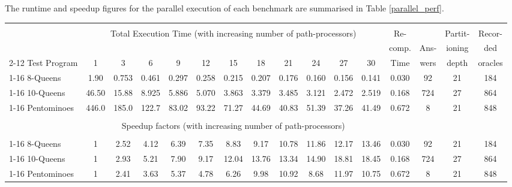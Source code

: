 The runtime and speedup figures for the parallel execution of each benchmark are summarised
in Table \ref{parallel_perf}.

\begin{sidewaystable}
{\small
\begin{tabular}{||l|c|c|c|c|c|c|c|c|c|c|c|c|c|c|c||} \hline
 & \multicolumn{11}{c|}{} & & &  & \\
 & \multicolumn{11}{c|}{ Total Execution Time (with increasing number of path-processors) }                          & Re-   &      & Partit-& Recor- \\
 & \multicolumn{11}{c|}{}                                                                                            & comp. & Ans- & ioning & ded    \\
  \cline{2-12} Test Program & 1     & 3     & 6     & 9     & 12    & 15    & 18    & 21    & 24    & 27    & 30     & Time  & wers & depth  & oracles\\
  \cline{1-16} 8-Queens     & 1.90  & 0.753 & 0.461 & 0.297 & 0.258 & 0.215 & 0.207 & 0.176 & 0.160 & 0.156 & 0.141  & 0.030 &  92  & 21     & 184  \\
  \cline{1-16} 10-Queens    & 46.50 & 15.88 & 8.925 & 5.886 & 5.070 & 3.863 & 3.379 & 3.485 & 3.121 & 2.472 & 2.519  & 0.168 & 724  & 27     & 864   \\
  \cline{1-16} Pentominoes  & 446.0 & 185.0 & 122.7 & 83.02 & 93.22 & 71.27 & 44.69 & 40.83 & 51.39 & 37.26 & 41.49  & 0.672 &   8  & 21     & 848 \\
\hline
 & \multicolumn{11}{c|}{} & & & & \\
 & \multicolumn{11}{c|}{ Speedup factors (with increasing number of path-processors) } & & & & \\
 & \multicolumn{11}{c|}{} & & & &  \\
  \cline{1-16} 8-Queens    & 1      & 2.52  & 4.12  & 6.39  & 7.35  & 8.83  & 9.17  & 10.78 & 11.86 & 12.17 & 13.46  & 0.030 &  92  & 21     & 184  \\
  \cline{1-16} 10-Queens   & 1      & 2.93  & 5.21  & 7.90  & 9.17  & 12.04 & 13.76 & 13.34 & 14.90 & 18.81 & 18.45  & 0.168 & 724  & 27     & 864   \\
  \cline{1-16} Pentominoes & 1      & 2.41  & 3.63  & 5.37  & 4.78  & 6.26  & 9.98  & 10.92 & 8.68  & 11.97 & 10.75  & 0.672 &   8  & 21     & 848 \\
\hline
\end{tabular}
\caption{Parallel execution performance of PrologPF for
appropriate partitioning-depths.}
\label{parallel_perf}
}
\end{sidewaystable}

